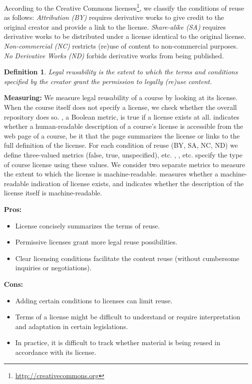 \documentclass{sig-alternate}
\theoremstyle{definition}
\newtheorem{defn}{Definition}
\begin{document}
According to the Creative Commons licenses\footnote{\url{http://creativecommons.org}}, we classify the conditions of reuse as follows:
\emph{Attribution (BY)} requires derivative works to give credit to the original creator and provide a link to the license.
\emph{Share-alike (SA)} requires derivative works to be distributed under a license identical to the original license.
\emph{Non-commercial (NC)} restricts (re)use of content to non-commercial purposes.
\emph{No Derivative Works (ND)} forbids derivative works from being published.

\begin{defn}
\emph{Legal reusability is the extent to which the terms and conditions specified by the creator grant the permission to legally (re)use content.}
\end{defn}

\noindent\textbf{Measuring:}
We measure legal reusability of a course by looking at its license.
When the course itself does not specify a license, we check whether the overall repository does so.
, a Boolean metric, is true if a license exists at all.
 indicates whether a human-readable description of a course's license is accessible from the web page of a course, be it that the page summarizes the license or links to the full definition of the license.
For each condition of reuse (BY, SA, NC, ND) we define three-valued metrics (false, true, unspecified), etc.
, , etc. specify the type of course license using these values.
We consider two separate metrics to measure the extent to which the license is machine-readable.
 measures whether a machine-readable indication of license exists,
and  indicates whether the description of the license itself is machine-readable.




\noindent\textbf{Pros:}
\begin{itemize}
\item License concisely summarizes the terms of reuse.
\item Permissive licenses grant more legal reuse possibilities.
\item Clear licensing conditions facilitate the content reuse (without cumbersome inquiries or negotiations).
\end{itemize}
\noindent\textbf{Cons:}
\begin{itemize}
\item Adding certain conditions to licenses can limit reuse.
\item Terms of a license might be difficult to understand or require interpretation and adaptation in certain legislations.
\item In practice, it is difficult to track whether material is being reused in accordance with its license.
\end{itemize}
\end{document}
